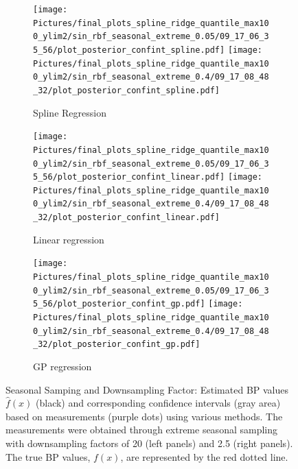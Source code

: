 \begin{figure}
\begin{subfigure}{\textwidth}
    \centering
    \texttt{[image: 
        Pictures/final\_plots\_spline\_ridge\_quantile\_max100\_ylim2/sin\_rbf\_seasonal\_extreme\_0.05/09\_17\_06\_35\_56/plot\_posterior\_confint\_spline.pdf]}
    \texttt{[image: 
    Pictures/final\_plots\_spline\_ridge\_quantile\_max100\_ylim2/sin\_rbf\_seasonal\_extreme\_0.4/09\_17\_08\_48\_32/plot\_posterior\_confint\_spline.pdf]}
  \caption{Spline Regression}
\end{subfigure}

\begin{subfigure}{\textwidth}
    \centering
    \texttt{[image: 
    Pictures/final\_plots\_spline\_ridge\_quantile\_max100\_ylim2/sin\_rbf\_seasonal\_extreme\_0.05/09\_17\_06\_35\_56/plot\_posterior\_confint\_linear.pdf]}
    \texttt{[image: 
       Pictures/final\_plots\_spline\_ridge\_quantile\_max100\_ylim2/sin\_rbf\_seasonal\_extreme\_0.4/09\_17\_08\_48\_32/plot\_posterior\_confint\_linear.pdf]}
  \caption{Linear regression }
\end{subfigure}

\begin{subfigure}{\textwidth}
    \centering
    \texttt{[image: 
    Pictures/final\_plots\_spline\_ridge\_quantile\_max100\_ylim2/sin\_rbf\_seasonal\_extreme\_0.05/09\_17\_06\_35\_56/plot\_posterior\_confint\_gp.pdf]}
    \texttt{[image: 
       Pictures/final\_plots\_spline\_ridge\_quantile\_max100\_ylim2/sin\_rbf\_seasonal\_extreme\_0.4/09\_17\_08\_48\_32/plot\_posterior\_confint\_gp.pdf]}
  \caption{GP regression}
\end{subfigure}\hfill

\caption[Seasonal Samping and Downsampling Factor Example 1]{Seasonal Samping and Downsampling Factor:
    Estimated BP values $\hat{f}(x)$ (black) and corresponding confidence intervals (gray area)
    based on measurements (purple dots) using various methods.
    The measurements were obtained through extreme seasonal sampling with downsampling
    factors of 20 (left panels) and 2.5 (right panels).
    The true BP values, $f(x)$, are represented by the red dotted line.}
\label{fig:ex-seasonal-sampling-linear}
\end{figure}


